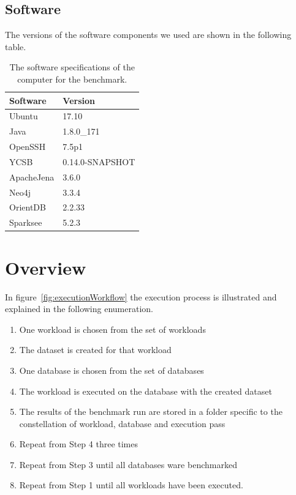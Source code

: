 \subsection{Software}
The versions of the software components we used are shown in the following table.

\begin{table}[!h]
  \begin{minipage}{\textwidth}
    \begin{tabularx}{\textwidth}{ | X | X | }
      \hline
      Software & Version \\ \hline \hline
      Ubuntu & 17.10 \\ \hline
      Java & 1.8.0\_171 \\ \hline
      OpenSSH & 7.5p1 \\ \hline
      YCSB & 0.14.0-SNAPSHOT \\ \hline
      ApacheJena & 3.6.0 \\ \hline
      Neo4j & 3.3.4 \\ \hline
      OrientDB & 2.2.33 \\ \hline
      Sparksee & 5.2.3 \\ \hline
    \end{tabularx}
  \end{minipage}
  \caption{The software specifications of the computer for the benchmark.}
  \label{tab:software}
\end{table}

\section{Overview}
\label{ch:evaluation:se:overview}
In figure~\ref{fig:executionWorkflow} the execution process is illustrated and explained in the following enumeration.

\begin{enumerate}[label=Step \arabic*:,widest=Step 1,leftmargin=*]
  \item One workload is chosen from the set of workloads
  \item The dataset is created for that workload
  \item One database is chosen from the set of databases
  \item The workload is executed on the database with the created dataset
  \item The results of the benchmark run are stored in a folder specific to the constellation of workload,
  database and execution pass
  \item Repeat from Step 4 three times
  \item Repeat from Step 3 until all databases ware benchmarked
  \item Repeat from Step 1 until all workloads have been executed.
\end{enumerate}

